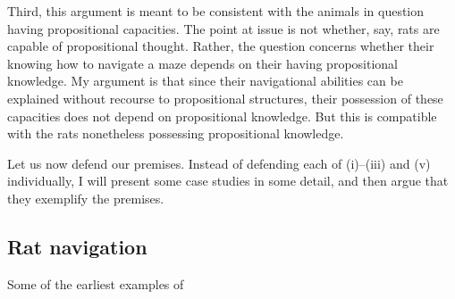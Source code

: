 Third, this argument is meant to be consistent with the animals in question having propositional capacities.
The point at issue is not whether, say, rats are capable of propositional thought.
Rather, the question concerns whether their knowing how to navigate a maze depends on their having propositional knowledge.
My argument is that since their navigational abilities can be explained without recourse to propositional structures, their possession of these capacities does not depend on propositional knowledge.
But this is compatible with the rats nonetheless possessing propositional knowledge.

Let us now defend our premises.
Instead of defending each of (i)--(iii) and (v) individually, I will present some case studies in some detail, and then argue that they exemplify the premises.

\subsection{Rat navigation}

Some of the earliest examples of 
